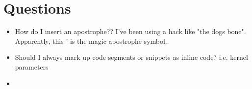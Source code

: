 \chapter{Questions} %
\label{cha:Questions}
    
\begin{itemize}
    \item How do I insert an apostrophe??  I've been using a hack like "the dog{\vtick}s bone".  Apparently, this ' is the magic apostrophe symbol.  
    \item Should I always mark up code segments or snippets as inline code? i.e. kernel parameters
    \item 
\end{itemize}
